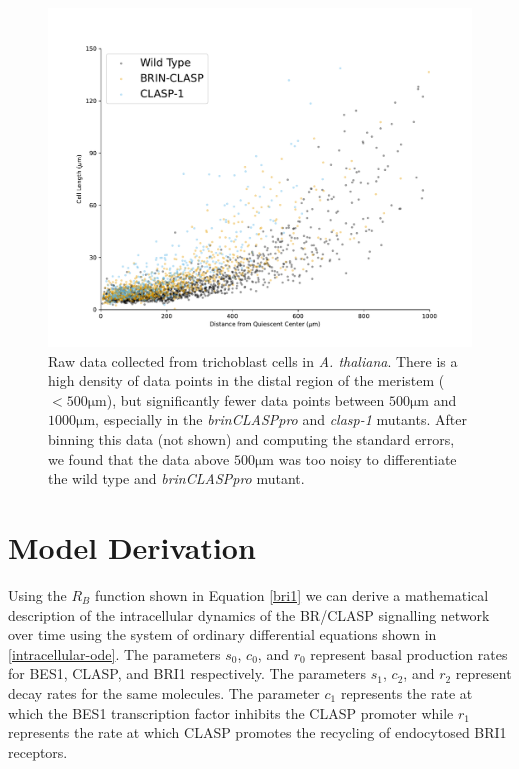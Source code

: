 \documentclass[referee,pdflatex,sn-mathphys-num]{sn-jnl}
\newcommand{\um}{\unit{\micro\metre}}
\begin{document}
\begin{appendices}
\begin{figure}
  \centering
  \includegraphics[width=\textwidth]{data-trichoblast.pdf}
  \caption{Raw data collected from trichoblast cells in \emph{A. thaliana}. There is a high density of data points in the distal region of the meristem ($< 500\um$), but significantly fewer data points between $500\um$ and $1000\um$, especially in the \emph{brinCLASPpro} and \emph{clasp-1} mutants. After binning this data (not shown) and computing the standard errors, we found that the data above $500\um$ was too noisy to differentiate the wild type and \emph{brinCLASPpro} mutant. }
  \label{data}
\end{figure}

\section{Model Derivation}\label{secA2}

Using the $R_{B}$ function shown in Equation \eqref{bri1} we can derive a mathematical description of the intracellular dynamics of the BR/CLASP signalling network over time using the system of ordinary differential equations shown in \eqref{intracellular-ode}. The parameters $s_{0}$, $c_{0}$, and $r_{0}$ represent basal production rates for BES1, CLASP, and BRI1 respectively. The parameters $s_{1}$, $c_{2}$, and $r_{2}$ represent decay rates for the same molecules. The parameter $c_{1}$ represents the rate at which the BES1 transcription factor inhibits the CLASP promoter while $r_{1}$ represents the rate at which CLASP promotes the recycling of endocytosed BRI1 receptors.


\end{appendices}
\end{document}
